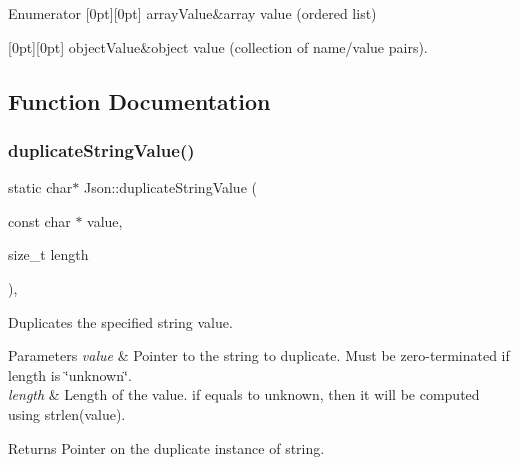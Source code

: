 \begin{DoxyEnumFields}{Enumerator}
[0pt][0pt]{}\mbox{\label{namespaceJson_a7d654b75c16a57007925868e38212b4eadc8f264f36b55b063c78126b335415f4}} 
array\+Value&array value (ordered list) \\
\hline

[0pt][0pt]{}\mbox{\label{namespaceJson_a7d654b75c16a57007925868e38212b4eae8386dcfc36d1ae897745f7b4f77a1f6}} 
object\+Value&object value (collection of name/value pairs). \\
\hline

\end{DoxyEnumFields}


\subsection{Function Documentation}
\mbox{\label{namespaceJson_a678ac3a60cd70ec0fb4c9abfd40eb0c4}} 
\subsubsection{\texorpdfstring{duplicate\+String\+Value()}{duplicateStringValue()}}
{\footnotesize\ttfamily static char$\ast$ Json\+::duplicate\+String\+Value (\begin{DoxyParamCaption}\item[{const char $\ast$}]{value,  }\item[{size\+\_\+t}]{length }\end{DoxyParamCaption})\hspace{0.3cm}{\ttfamily [inline]}, {\ttfamily [static]}}

Duplicates the specified string value. 
\begin{DoxyParams}{Parameters}
{\em value} & Pointer to the string to duplicate. Must be zero-\/terminated if length is \char`\"{}unknown\char`\"{}. \\
\hline
{\em length} & Length of the value. if equals to unknown, then it will be computed using strlen(value). \\
\hline
\end{DoxyParams}
\begin{DoxyReturn}{Returns}
Pointer on the duplicate instance of string. 
\end{DoxyReturn}
\mbox{\label{namespaceJson_a4f93f184c2890cb99b07afeed10a89ec}} 
